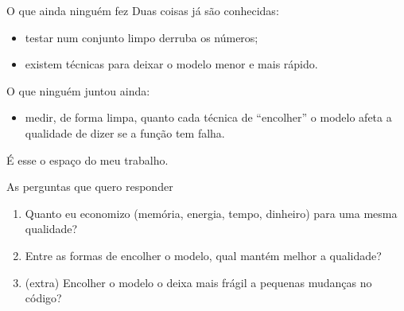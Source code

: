 \documentclass[aspectratio=169,11pt]{beamer}
\begin{document}
\begin{frame}{O que ainda ninguém fez}
  Duas coisas já são conhecidas:
  \begin{itemize}
    \item testar num conjunto limpo derruba os números;
    \item existem técnicas para deixar o modelo menor e mais rápido.
  \end{itemize}
  \vspace{1em}
  O que ninguém juntou ainda:
  \begin{itemize}
    \item medir, de forma limpa, quanto cada técnica de ``encolher'' o modelo
          afeta a qualidade de dizer se a função tem falha.
  \end{itemize}
  \vspace{1em}
  É esse o espaço do meu trabalho.
\end{frame}

\begin{frame}{As perguntas que quero responder}
  \begin{enumerate}
    \item Quanto eu economizo (memória, energia, tempo, dinheiro) para uma mesma
          qualidade?
    \item Entre as formas de encolher o modelo, qual mantém melhor a qualidade?
    \item (extra) Encolher o modelo o deixa mais frágil a pequenas mudanças no código?
  \end{enumerate}
\end{frame}
\end{document}
